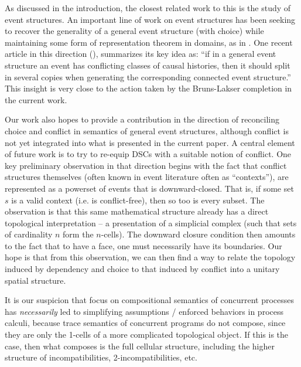 \documentclass[hoptionsi,review,screen,format=sigconf]{acmart}
\theoremstyle{definition}
\begin{document}
As discussed in the introduction, the closest related work to this is the study of event structures. An important line of work on event structures has been seeking to recover the generality of a general event structure (with choice) while maintaining some form of representation theorem in domains, as in \cite{nielsen1981petri}. One recent article in this direction (\cite{DBLP:journals/corr/abs-1802-03726}), summarizes its key idea as: ``if in a general event structure an event has conflicting classes of causal histories, then it should split in several copies when generating the corresponding connected event structure.'' This insight is very close to the action taken by the Bruns-Lakser completion in the current work.

Our work also hopes to provide a contribution in the direction of reconciling choice and conflict in semantics of  general event structures, although conflict is not yet integrated into what is presented in the current paper. A central element of future work is to try to re-equip DSCs with a suitable notion of conflict. One key preliminary observation in that direction begins with the fact that conflict structures themselves (often known in event literature often as ``contexts''), are represented as a powerset of events that is downward-closed. That is, if some set \(s\) is a valid context (i.e. is conflict-free), then so too is every subset. The observation is that this same mathematical structure already has a direct topological interpretation -- a presentation of a simplicial complex (such that sets of cardinality \(n\) form the \(n\)-cells). The downward closure condition then amounts to the fact that to have a face, one must necessarily have its boundaries. Our hope is that from this observation, we can then find a way to relate the topology induced by dependency and choice to that induced by conflict into a unitary spatial structure.

It is our suspicion that focus on compositional semantics of concurrent processes has \textit{necessarily} led to simplifying assumptions / enforced behaviors in process calculi, because trace semantics of concurrent programs do not compose, since they are only the 1-cells of a more complicated topological object. If this is the case, then what composes is the full cellular structure, including the higher structure of incompatibilities, 2-incompatibilities, etc.
\end{document}
